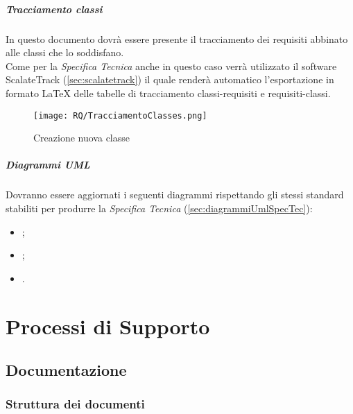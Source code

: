 \documentclass{scalatekids-article}
\begin{document}
\subparagraph{Tracciamento classi}

In questo documento dovrà essere presente il tracciamento dei requisiti abbinato
alle classi che lo soddisfano.\\Come per la \textit{Specifica Tecnica} anche in
questo caso verrà utilizzato il software ScalateTrack (\ref{sec:scalatetrack})
il quale renderà automatico l'esportazione in formato \LaTeX\xspace delle
tabelle di tracciamento classi-requisiti e requisiti-classi.

\begin{figure}[H]
  \centering
  \texttt{[image: RQ/TracciamentoClasses.png]}
  \caption{Creazione nuova classe}
\end{figure}

\subparagraph{Diagrammi UML}

Dovranno essere aggiornati i seguenti diagrammi rispettando gli stessi standard
stabiliti per produrre la \textit{Specifica Tecnica} (\ref{sec:diagrammiUmlSpecTec}):
\begin{itemize}
\item {};
\item {};
\item {}.
\end{itemize}

\section{Processi di Supporto}

\subsection{Documentazione}

\subsubsection{Struttura dei documenti}
\end{document}
